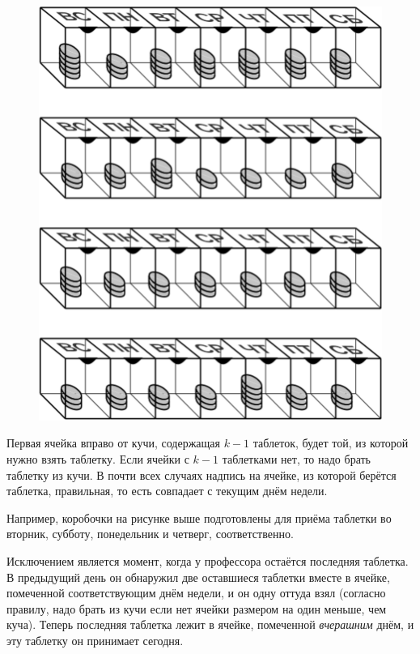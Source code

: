 \begin{figure}[h!]
\centering
\includegraphics[scale=0.5]{Figs/Handicaps/box1-ru}
\end{figure}

Первая ячейка вправо от кучи, содержащая $k-1$ таблеток, будет той, из которой нужно взять таблетку.
Если ячейки с $k-1$ таблетками нет, то надо брать таблетку из кучи.
В почти всех случаях надпись на ячейке, из которой берётся таблетка, правильная, то есть совпадает с текущим днём недели.

Например, коробочки на рисунке выше подготовлены для приёма таблетки во вторник, субботу, понедельник и четверг, соответственно.

Исключением является момент, когда у профессора остаётся последняя таблетка.
В предыдущий день он обнаружил две оставшиеся таблетки вместе в ячейке, помеченной соответствующим днём недели, и он одну оттуда взял (согласно правилу, надо брать из кучи если нет ячейки размером на один меньше, чем куча).
Теперь последняя таблетка лежит в ячейке, помеченной \emph{вчерашним} днём, и эту таблетку он принимает сегодня.


